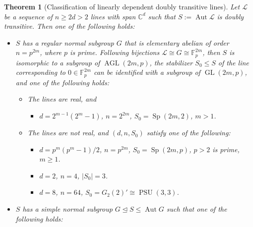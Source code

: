 \documentclass[11pt]{article}
\newtheorem{theorem}[theo]{Theorem}
\theoremstyle{definition}
\numberwithin{equation}{section}
\begin{document}
\begin{theorem}[Classification of linearly dependent doubly transitive lines]
\label{thm:classification}
Let $\mathscr{L}$ be a sequence of $n\geq 2d > 2$ lines with span $\mathbb{C}^d$ such that $S := \operatorname{Aut} \mathscr{L}$ is doubly transitive.
Then one of the following holds:
\begin{itemize}
\item[(I)]
$S$ has a regular normal subgroup $G$ that is elementary abelian of order $n = p^{2m}$, where $p$ is prime.
Following bijections $\mathscr{L} \cong G \cong \mathbb{F}_p^{2m}$, then $S$ is isomorphic to a subgroup of $\operatorname{AGL}(2m,p)$, the stabilizer $S_0 \leq S$ of the line corresponding to $0 \in \mathbb{F}_p^{2m}$ can be identified with
a subgroup of $\operatorname{GL}(2m,p)$, and one of the following holds:

	\begin{itemize}
	\item[(A)]
	The lines are real, and
		\begin{itemize}
		\item[(i)]
		$d = 2^{m-1}(2^m - 1)$, $n = 2^{2m}$, $S_0 = \operatorname{Sp}(2m,2)$, $m > 1$.
		\end{itemize}
	
	\item[(B)]
	The lines are not real, and $(d,n,S_0)$ satisfy one of the following:
		\begin{itemize}
		\item[(ii)]
		$d = p^m(p^m-1)/2$, $n=p^{2m}$, $S_0=\operatorname{Sp}(2m,p)$, $p>2$ is prime, $m \geq 1$.
		\item[(iii)]
		$d = 2$, $n=4$, $|S_0|=3$.
		\item[(iv)]
		$d = 8$, $n = 64$, $S_0=G_2(2)'\cong\operatorname{PSU}(3,3)$.
		\end{itemize}
	
	\end{itemize}
	
\item[(II)]
$S$ has a simple normal subgroup $G \unlhd S \leq \operatorname{Aut} G$ such that one of the following holds:


\end{itemize}
\end{theorem}
\end{document}
